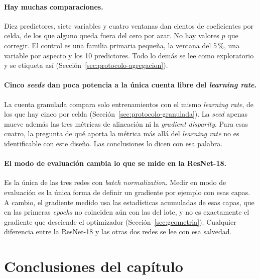 \paragraph{Hay muchas comparaciones.} Diez predictores, siete variables y cuatro ventanas dan cientos de coeficientes por celda, de los que alguno queda fuera del cero por azar. No hay valores $p$ que corregir. El control es una familia primaria pequeña, la ventana del 5\,\%, una variable por aspecto y los 10 predictores. Todo lo demás se lee como exploratorio y se etiqueta así (Sección~\ref{sec:protocolo-agregacion}).

\paragraph{Cinco \emph{seeds} dan poca potencia a la única cuenta libre del \emph{learning rate}.} La cuenta granulada compara solo entrenamientos con el mismo \emph{learning rate}, de los que hay cinco por celda (Sección~\ref{sec:protocolo-granulada}). La \emph{seed} apenas mueve además las tres métricas de alineación ni la \emph{gradient disparity}. Para esas cuatro, la pregunta de qué aporta la métrica más allá del \emph{learning rate} no es identificable con este diseño. Las conclusiones lo dicen con esa palabra.

\paragraph{El modo de evaluación cambia lo que se mide en la ResNet-18.} Es la única de las tres redes con \emph{batch normalization}. Medir en modo de evaluación es la única forma de definir un gradiente por ejemplo con esas capas. A cambio, el gradiente medido usa las estadísticas acumuladas de esas capas, que en las primeras \emph{epochs} no coinciden aún con las del lote, y no es exactamente el gradiente que desciende el optimizador (Sección~\ref{sec:geometria}). Cualquier diferencia entre la ResNet-18 y las otras dos redes se lee con esa salvedad.

\section{Conclusiones del capítulo}
\label{sec:met-conclusiones}


